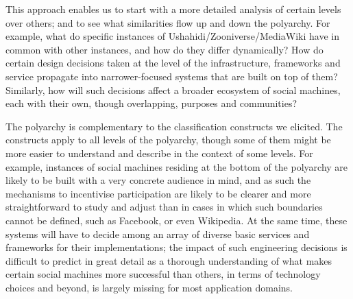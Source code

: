 \documentclass{sig-alternate}
\begin{document}
This approach enables us to start with a more detailed analysis of certain levels over others;
and to see what similarities flow up and down the polyarchy. For example, what do
specific instances of Ushahidi/Zooniverse/MediaWiki have in common with other instances, and
how do they differ dynamically? How do certain design decisions taken at the level of the infrastructure, frameworks and service propagate into narrower-focused systems that are built on top of them? Similarly, how will such decisions affect a broader ecosystem of social machines, each with their own, though overlapping, purposes and communities?

The polyarchy is complementary to the classification constructs we elicited. The constructs apply to all levels of the polyarchy, though some of them might be more easier to understand and describe in the context of some levels. For example, instances of social machines residing at the bottom of the polyarchy are likely to be built with a very concrete audience in mind, and as such the mechanisms to incentivise participation are likely to be clearer and more straightforward to study and adjust than in cases in which such boundaries cannot be defined, such as Facebook, or even Wikipedia. At the same time, these systems will have to decide among an array of diverse basic services and frameworks for their implementations; the impact of such engineering decisions is difficult to predict in great detail as a thorough understanding of what makes certain social machines more successful than others, in terms of technology choices and beyond, is largely missing for most application domains.

\end{document}

